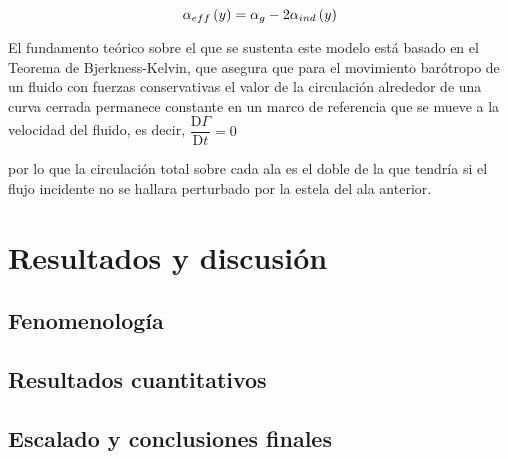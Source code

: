\begin{equation}
\alpha_{eff}\left(y\right) = \alpha_{g} - 2\alpha_{ind}\left(y\right)
\LABEQ{alphaInd}
\end{equation}

El fundamento teórico sobre el que se sustenta este modelo está basado en el Teorema de Bjerkness-Kelvin, que asegura que para el movimiento barótropo de un fluido con fuerzas conservativas el valor de la circulación alrededor de una curva cerrada permanece constante en un marco de referencia que se mueve a la velocidad del fluido, es decir,
$\dfrac{\mathrm{D}\Gamma}{\mathrm{D}t} = 0$

por lo que la circulación total sobre cada ala es el doble de la que tendría si el flujo incidente no se hallara perturbado por la estela del ala anterior. 

\section{Resultados y discusión}

\subsection{Fenomenología}

\subsection{Resultados cuantitativos}

\subsection{Escalado y conclusiones finales}






